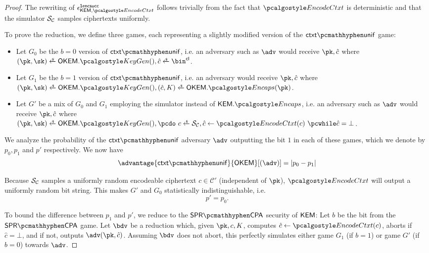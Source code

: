 \begin{proof}
    The rewriting of $\epsilon^\firstencapssuccess_{\KEM,\encodectxt}$ follows trivially from the fact that $\encodectxt$ is deterministic and that the simulator $\mathcal{S}_\mathcal{C}$ samples ciphertexts uniformly.

    To prove the reduction, we define three games, each representing a slightly modified version of the $\ctxtunif$ game:
    \begin{itemize}
        \item Let $G_0$ be the $b=0$ version of $\ctxtunif$, i.e. an adversary such as $\adv$ would receive $\pk, \hat c$ where 
        $(\pk,\sk) \getsr \OKEM.\kgen(), \hat c \getsr \bin^\obfctxtlen$.
        \item Let $G_1$ be the $b=1$ version of $\ctxtunif$, i.e. an adversary would receive $\pk, \hat c$ where\\
        $(\pk,\sk) \getsr \OKEM.\kgen(), (\hat c, K) \getsr \OKEM.\encaps(\pk)$.
        \item Let $G'$ be a mix of $G_0$ and $G_1$ employing the simulator instead of $\KEM.\encaps$, i.e. an adversary such as $\adv$ would receive $\pk, \hat c$ where\\
        $(\pk,\sk) \getsr \OKEM.\kgen(), \pcdo\ c \getsr \simulunif, \hat c \gets \encodectxt(c)\ \pcwhile \hat c = \bot$.
    \end{itemize}

    We analyze the probability of the $\ctxtunif$ adversary $\adv$ outputting the bit $1$ in each of these games, which we denote by $p_0, p_1$ and $p'$ respectively.
    We now have
    \[
        \advantage{\ctxtunif}{\OKEM}[(\adv)] = \left| p_0 - p_1 \right|
    \]

    Because $\mathcal{S}_\mathcal{C}$ samples a uniformly random encodeable ciphertext $c \in \mathcal{C}'$ (independent of $\pk$), $\encodectxt$ will output a uniformly random bit string. This makes $G'$ and $G_0$ statistically indistinguishable, i.e.
    \[ p' = p_0. \]

    To bound the difference between $p_1$ and $p'$, we reduce to the $\sprcpa$ security of $\mathsf{KEM}$:
    Let $b$ be the bit from the $\sprcpa$ game. Let $\bdv$ be a reduction which, given $\pk, c, K$, computes $\hat c \gets \encodectxt(c)$, aborts if $\hat c = \bot$, and if not, outputs $\adv(\pk, \hat c)$.
    Assuming $\bdv$ does not abort, this perfectly simulates either game $G_1$ (if $b=1$) or game $G'$ (if $b=0$) towards $\adv$.
    

\end{proof}
